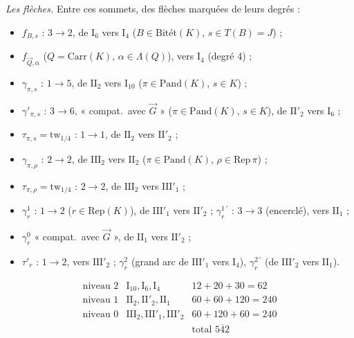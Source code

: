 \documentclass[11pt,a4paper]{article}
\begin{document}
\emph{Les flèches.} Entre ces sommets, des flèches marquées de leurs
degrés :
\begin{itemize}
  \item $f_{B,s}$ : $3 \to 2$, de $\mathrm{I}_6$ vers $\mathrm{I}_4$
    ($B \in \mathrm{Bitét}(K)$, $s \in T(B) = J$) ;
  \item $f_{\vec{Q},\alpha}$ ($Q = \mathrm{Carr}(K)$, $\alpha \in
    \Lambda(Q)$), vers $\mathrm{I}_4$ (degré 4) ;
  \item $\gamma_{\pi,s}$ : $1 \to 5$, de $\mathrm{II}_2$ vers
    $\mathrm{I}_{10}$ ($\pi \in \mathrm{Pand}(K)$, $s \in K$) ;
  \item $\gamma'_{\pi,s}$ : $3 \to 6$, « compat.\ avec $\vec{G}$ »
    ($\pi \in \mathrm{Pand}(K)$, $s \in K$), de $\mathrm{II}'_2$ vers
    $\mathrm{I}_6$ ;
  \item $\tau_{\pi,s} = \mathrm{tw}_{1/4}$ : $1 \to 1$, de $\mathrm{II}_2$
    vers $\mathrm{II}'_2$ ;
  \item $\gamma_{\pi,\rho}$ : $2 \to 2$, de $\mathrm{III}_2$ vers
    $\mathrm{II}_2$ ($\pi \in \mathrm{Pand}(K)$, $\rho \in \mathrm{Rep}\,
    \pi$) ;
  \item $\tau_{\pi,\rho} = \mathrm{tw}_{1/4}$ : $2 \to 2$, de
    $\mathrm{III}_2$ vers $\mathrm{III}'_1$ ;
  \item $\gamma^{1}_{r}$ : $1 \to 2$ ($r \in \mathrm{Rep}(K)$), de
    $\mathrm{III}'_1$ vers $\mathrm{II}'_2$ ; $\gamma^{1\,\prime}_{r}$ :
    $3 \to 3$ (encerclé), vers $\mathrm{II}_1$ ;
  \item $\gamma^{0}_{r}$ « compat.\ avec $\vec{G}$ », de
    $\mathrm{II}_1$ vers $\mathrm{II}'_2$ ;
  \item $\tau'_{r}$ : $1 \to 2$, vers $\mathrm{III}'_2$ ;
    $\gamma^{2}_{r}$ (grand arc de $\mathrm{III}'_1$ vers
    $\mathrm{I}_4$), $\gamma^{2\,\prime}_{r}$ (de $\mathrm{III}'_2$ vers
    $\mathrm{II}_1$).
\end{itemize}

\[
\begin{array}{llll}
\text{niveau 2} & \mathrm{I}_{10}, \mathrm{I}_{6}, \mathrm{I}_{4}
  & 12+20+30 = 62 \\
\text{niveau 1} & \mathrm{II}_{2}, \mathrm{II}'_{2}, \mathrm{II}_{1}
  & 60+60+120 = 240 \\
\text{niveau 0} & \mathrm{III}_{2}, \mathrm{III}'_{1},
  \mathrm{III}'_{2} & 60+120+60 = 240 \\
 & & \text{total } \overline{542}
\end{array}
\]
\end{document}
